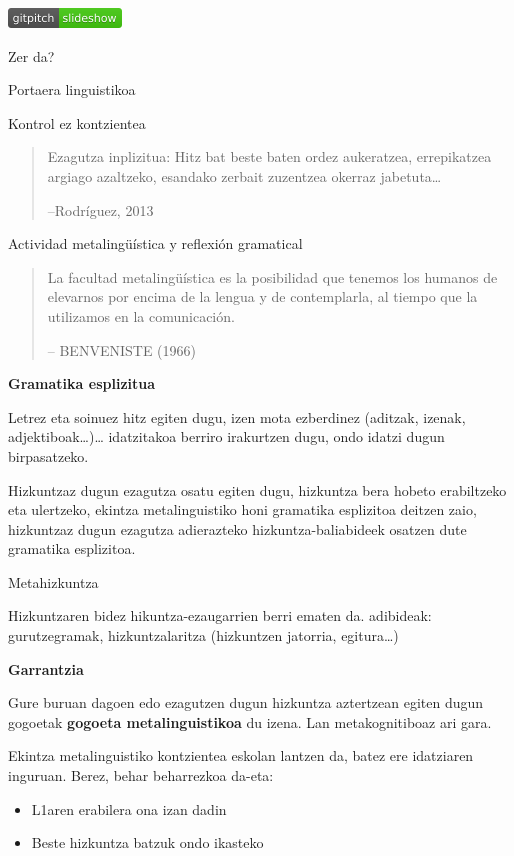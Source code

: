 \documentclass[
]{book}
\providecommand{\tightlist}{%
  \setlength{\itemsep}{0pt}\setlength{\parskip}{0pt}}
\begin{document}
\href{../Diapoak/07-GogoMetaDiapo.html}{\includegraphics{assets/badge.png}}

Zer da?

Portaera linguistikoa

Kontrol ez kontzientea

\begin{quote}
Ezagutza inplizitua: Hitz bat beste baten ordez aukeratzea, errepikatzea argiago azaltzeko, esandako zerbait zuzentzea okerraz jabetuta\ldots{}

--Rodríguez, 2013
\end{quote}

Actividad metalingüística y reflexión gramatical

\begin{quote}
La facultad metalingüística es la posibilidad que tenemos los humanos de elevarnos por encima de la lengua y de contemplarla, al tiempo que la utilizamos en la comunicación.

-- BENVENISTE (1966)
\end{quote}

\textbf{Gramatika esplizitua}

Letrez eta soinuez hitz egiten dugu, izen mota ezberdinez (aditzak, izenak, adjektiboak\ldots)\ldots{} idatzitakoa berriro irakurtzen dugu, ondo idatzi dugun birpasatzeko.

Hizkuntzaz dugun ezagutza osatu egiten dugu, hizkuntza bera hobeto erabiltzeko eta ulertzeko, ekintza metalinguistiko honi gramatika esplizitoa deitzen zaio, hizkuntzaz dugun ezagutza adierazteko hizkuntza-baliabideek osatzen dute gramatika esplizitoa.

Metahizkuntza

Hizkuntzaren bidez hikuntza-ezaugarrien berri ematen da. adibideak: gurutzegramak, hizkuntzalaritza (hizkuntzen jatorria, egitura\ldots)

\textbf{Garrantzia}

Gure buruan dagoen edo ezagutzen dugun hizkuntza aztertzean egiten dugun gogoetak \textbf{gogoeta metalinguistikoa} du izena. Lan metakognitiboaz ari gara.

Ekintza metalinguistiko kontzientea eskolan lantzen da, batez ere idatziaren inguruan. Berez, behar beharrezkoa da-eta:

\begin{itemize}
\tightlist
\item
  L1aren erabilera ona izan dadin
\item
  Beste hizkuntza batzuk ondo ikasteko
\end{itemize}
\end{document}
